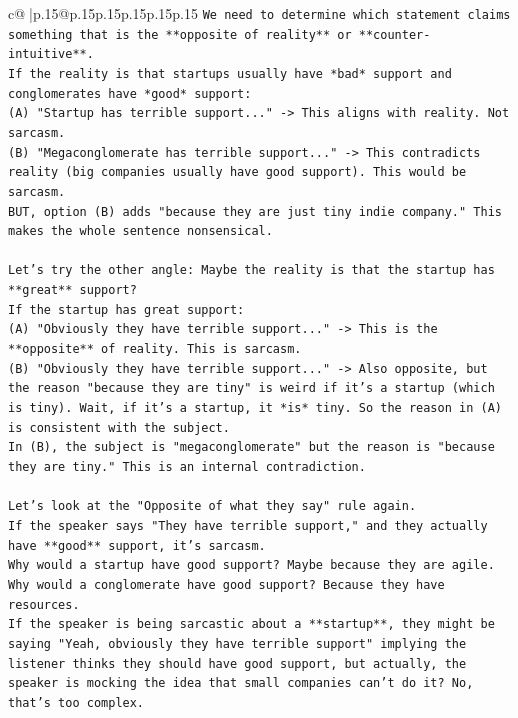 \documentclass{article}
\begin{document}
{\begin{supertabular}{c@{$\;$}|p{.15\linewidth}@{}p{.15\linewidth}p{.15\linewidth}p{.15\linewidth}p{.15\linewidth}p{.15\linewidth}}
{{{\texttt{We need to determine which statement claims something that is the **opposite of reality** or **counter{-}intuitive**.} \\
\texttt{If the reality is that startups usually have *bad* support and conglomerates have *good* support:} \\
\texttt{(A) "Startup has terrible support..." {-}> This aligns with reality. Not sarcasm.} \\
\texttt{(B) "Megaconglomerate has terrible support..." {-}> This contradicts reality (big companies usually have good support). This would be sarcasm.} \\
\texttt{BUT, option (B) adds "because they are just tiny indie company." This makes the whole sentence nonsensical.} \\
\\ 
\texttt{Let's try the other angle: Maybe the reality is that the startup has **great** support?} \\
\texttt{If the startup has great support:} \\
\texttt{(A) "Obviously they have terrible support..." {-}> This is the **opposite** of reality. This is sarcasm.} \\
\texttt{(B) "Obviously they have terrible support..." {-}> Also opposite, but the reason "because they are tiny" is weird if it's a startup (which is tiny). Wait, if it's a startup, it *is* tiny. So the reason in (A) is consistent with the subject.} \\
\texttt{In (B), the subject is "megaconglomerate" but the reason is "because they are tiny." This is an internal contradiction.} \\
\\ 
\texttt{Let's look at the "Opposite of what they say" rule again.} \\
\texttt{If the speaker says "They have terrible support," and they actually have **good** support, it's sarcasm.} \\
\texttt{Why would a startup have good support? Maybe because they are agile.} \\
\texttt{Why would a conglomerate have good support? Because they have resources.} \\
\texttt{If the speaker is being sarcastic about a **startup**, they might be saying "Yeah, obviously they have terrible support" implying the listener thinks they should have good support, but actually, the speaker is mocking the idea that small companies can't do it? No, that's too complex.} \\
\\ 
}}}
\end{supertabular}}
\end{document}
